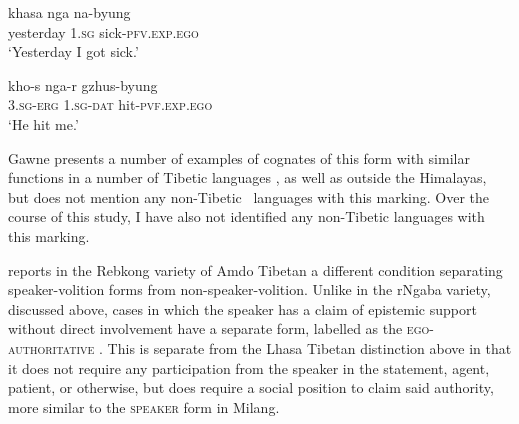 \begin{exe}
        \ex
        \begin{xlist}
                \ex\label{e:Description:LhasaEgoErgExperiencer}
                \gll khasa nga na-byung \\
                yesterday \textsc{1.sg} sick-\textsc{pfv.exp.ego} \\
                \glt `Yesterday I got sick.' \cite[Lhasa Tibetan,][169]{Garrett2001}

                \ex\label{e:Description:LhasaEgoAbsExperiencer}
                \gll kho-s nga-r gzhus-byung \\
                \textsc{3.sg-erg} \textsc{1.sg-dat} hit-\textsc{pvf.exp.ego} \\
                \glt `He hit me.' \cite[Lhasa Tibetan,][395]{DeLancey2017Tibetan}
        \end{xlist}
\end{exe}

Gawne presents a number of examples of cognates of this form with similar functions  in a number of Tibetic languages , as well as outside the Himalayas, but does not mention any non-Tibetic \lfam\ languages with this marking. Over the course of this study, I have also not identified any non-Tibetic languages with this marking.

 reports in the Rebkong variety of Amdo Tibetan a different condition separating speaker-volition forms from non-speaker-volition. Unlike in the rNgaba variety, discussed above, cases in which the speaker has a claim of epistemic support without direct involvement have a separate form, labelled as the \textsc{ego-authoritative} \cite[300]{Simon2021}. This is separate from the Lhasa Tibetan distinction above in that it does not require any participation from the speaker in the statement, agent, patient, or otherwise, but does require a social position to claim said authority, more similar to the \textsc{speaker} form in Milang.


